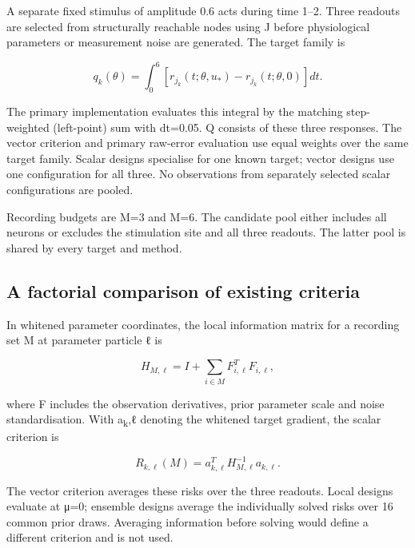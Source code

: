 A separate fixed stimulus of amplitude 0.6 acts during time 1--2. Three readouts are selected from structurally reachable nodes using J before physiological parameters or measurement noise are generated. The target family is

\begin{equation}
q_k(\theta)=\int_0^6[r_{j_k}(t;\theta,u_*)-r_{j_k}(t;\theta,0)]dt.
\end{equation}

The primary implementation evaluates this integral by the matching step-weighted (left-point) sum with dt=0.05. Q consists of these three responses. The vector criterion and primary raw-error evaluation use equal weights over the same target family. Scalar designs specialise for one known target; vector designs use one configuration for all three. No observations from separately selected scalar configurations are pooled.

Recording budgets are M=3 and M=6. The candidate pool either includes all neurons or excludes the stimulation site and all three readouts. The latter pool is shared by every target and method.

\subsection{A factorial comparison of existing criteria}

In whitened parameter coordinates, the local information matrix for a recording set M at parameter particle ℓ is

\begin{equation}
H_{M,\ell}=I+\sum_{i\in M} F_{i,\ell}^{T}F_{i,\ell},
\end{equation}

where F includes the observation derivatives, prior parameter scale and noise standardisation. With a\textsubscript{k},ℓ denoting the whitened target gradient, the scalar criterion is

\begin{equation}
R_{k,\ell}(M)=a_{k,\ell}^{T}H_{M,\ell}^{-1}a_{k,\ell}.
\end{equation}

The vector criterion averages these risks over the three readouts. Local designs evaluate at μ=0; ensemble designs average the individually solved risks over 16 common prior draws. Averaging information before solving would define a different criterion and is not used.

